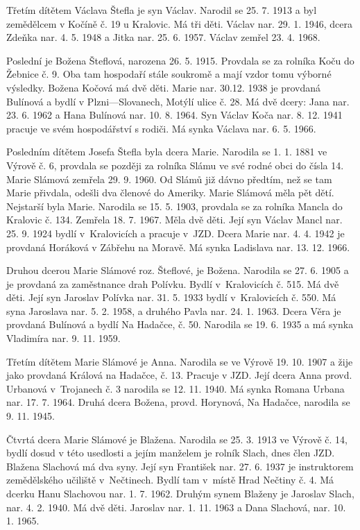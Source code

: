 \documentclass[../dejiny-rodu-prusiku.tex]{subfiles}
\begin{document}
Třetím dítětem Václava Štefla je syn Václav. Narodil se 25. 7. 1913 a byl zemědělcem v Kočíně č. 19 u Kralovic. Má tři děti. Václav nar. 29. 1. 1946, dcera Zdeňka nar. 4. 5. 1948 a Jitka nar. 25. 6. 1957. Václav zemřel 23. 4. 1968.

Poslední je Božena Šteflová, narozena 26. 5. 1915. Provdala se za rolníka Koču do Žebnice č. 9. Oba tam hospodaří stále soukromě a mají vzdor tomu výborné výsledky. Božena Kočová má dvě děti. Marie nar. 30.12. 1938 je provdaná Bulínová a bydlí v Plzni—Slovanech, Motýlí ulice č. 28. Má dvě dcery: Jana nar. 23. 6. 1962 a Hana Bulínová nar. 10. 8. 1964. Syn Václav Koča nar. 8. 12. 1941 pracuje ve svém hospodář­ství s rodiči. Má synka Václava nar. 6. 5. 1966.

Posledním dítětem Josefa Štefla byla dcera Marie. Narodila se 1. 1. 1881 ve Výrově č. 6, provdala se později za rolníka Slámu ve své rodné obci do čísla 14. Marie Slámová zemřela 29. 9. 1960. Od Slámů již dávno předtím, než se tam Marie přivdala, odešli dva členové do Ameriky. Marie Slámová měla pět dětí. Nejstarší byla Marie. Narodila se 15.  5. 1903, provdala se za rolníka Mancla do  Kralovic č. 134. Zemřela 18. 7. 1967. Měla dvě děti. Její syn Václav Mancl nar. 25. 9. 1924 bydlí v Kralovicích a pracuje v JZD. Dcera Marie nar. 4. 4. 1942 je provdaná Horáková
v Zábřehu na Moravě. Má synka Ladislava nar. 13. 12. 1966.

Druhou dcerou Marie Slámové roz. Šteflové, je Božena. Narodila se 27. 6. 1905 a je provdaná za zaměstnance drah Polívku. Bydlí v Kralovicích č. 515. Má dvě děti. Její syn Jaroslav  Polívka nar. 31. 5. 1933 bydlí v Kralovicích č. 550. Má syna Jaroslava nar. 5. 2. 1958, a druhého Pavla nar. 24. 1. 1963. Dcera Věra je provdaná Bulínová a bydlí Na Hadačce, č. 50. Narodila se 19. 6. 1935 a má synka Vla­dimíra nar. 9. 11. 1959.

Třetím dítětem Marie Slámové je Anna. Narodila se ve Výrově 19. 10. 1907 a žije jako provdaná Králová na Hadačce, č. 13. Pracuje v JZD. Její dcera Anna provd. Urbanová v Trojanech č. 3 narodila se 12. 11. 1940. Má synka Romana Urbana nar. 17. 7. 1964. Druhá dcera Božena, provd. Horynová, Na Hadačce, narodila se 9. 11. 1945.

Čtvrtá dcera Marie Slámové je Blažena. Narodila se 25. 3. 1913 ve Výrově č. 14, bydlí dosud v této usedlosti a jejím manželem je rolník Slach, dnes člen JZD. Blažena Slachová má dva syny. Její syn František nar. 27. 6. 1937 je instruktorem zemědělského učiliště v Nečtinech. Bydlí tam v místě Hrad Nečtiny č. 4. Má dcerku Hanu Slachovou nar. 1. 7. 1962. Druhým synem Blaženy je Jaroslav Slach, nar. 4. 2. 1940. Má dvě děti. Jaroslav nar. 1. 11. 1963 a Dana Slachová, nar. 10. 1. 1965.
\end{document}

